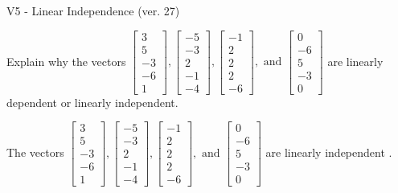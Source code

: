 \begin{exercise}
  \begin{exerciseTitle}V5 - Linear Independence (ver. 27)\end{exerciseTitle}
  \begin{exerciseStatement}
    Explain why the vectors \(\left[\begin{array}{r}
3 \\
5 \\
-3 \\
-6 \\
1
\end{array}\right] , \left[\begin{array}{r}
-5 \\
-3 \\
2 \\
-1 \\
-4
\end{array}\right] , \left[\begin{array}{r}
-1 \\
2 \\
2 \\
2 \\
-6
\end{array}\right] , \text{ and } \left[\begin{array}{r}
0 \\
-6 \\
5 \\
-3 \\
0
\end{array}\right]\) are linearly dependent or linearly independent.	


  \end{exerciseStatement}
  \begin{exerciseAnswer}
   The vectors \(\left[\begin{array}{r}
3 \\
5 \\
-3 \\
-6 \\
1
\end{array}\right] , \left[\begin{array}{r}
-5 \\
-3 \\
2 \\
-1 \\
-4
\end{array}\right] , \left[\begin{array}{r}
-1 \\
2 \\
2 \\
2 \\
-6
\end{array}\right] , \text{ and } \left[\begin{array}{r}
0 \\
-6 \\
5 \\
-3 \\
0
\end{array}\right]\) are 
  	 linearly independent  .
  


  \end{exerciseAnswer}
\end{exercise}